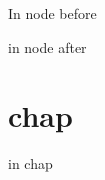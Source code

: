 \documentclass{book}
\newcommand{\Texinfothechapterheading}{}
\newcommand{\Texinfoheadingchaptername}{\chaptername}
\newcommand{\Texinfochapter}[1]{\chapter{#1}
\renewcommand{\Texinfothechapterheading}{\Texinfoheadingchaptername{} \thechapter{} }%
}%
\renewcommand{\_}{\Texinfounderscore\discretionary{}{}{}}
\begin{document}
\label{anchor:node-before}%

In node before

\label{anchor:Top}%
\label{anchor:after}%

in node after

\Texinfochapter{{chap}}
\label{anchor:chap}%

in chap
\end{document}
